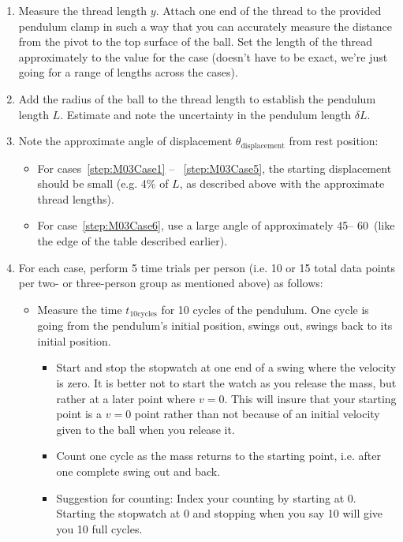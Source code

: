 \begin{enumerate}
\item Measure the thread length $y$. Attach one end of the thread to the provided pendulum clamp in such a way that you can accurately measure the distance from the pivot to the top surface of the ball. Set the length of the thread approximately to the value for the case (doesn't have to be exact, we're just going for a range of lengths across the cases).
\item Add the radius of the ball to the thread length to establish the pendulum length $L$. Estimate and note the uncertainty in the pendulum length $\delta L$.
\item Note the approximate angle of displacement $\theta_\text{displacement}$ from rest position:
    \begin{itemize}
        \item For cases~\ref{step:M03Case1} -- ~\ref{step:M03Case5}, the starting displacement should be small (e.g. 4\% of $L$, as described above with the approximate thread lengths).
        \item For case~\ref{step:M03Case6}, use a large angle of approximately 45\degree -- 60\degree~(like the edge of the table described earlier).
    \end{itemize}
\item For each case, perform 5 time trials per person (i.e. 10 or 15 total data points per two- or three-person group as mentioned above) as follows:
  \begin{itemize}
  \item Measure the time $t_{10\text{cycles}}$ for 10 cycles of the pendulum. One cycle is going from the pendulum's initial position, swings out, swings back to its initial position.
    \begin{itemize}
        \item Start and stop the stopwatch at one end of a swing where the velocity is zero. It is better not to start the watch as you release the mass, but rather at a later point where $v = 0$. This will insure that your starting point is a $v = 0$ point rather than not because of an initial velocity given to the ball when you release it. 
        \item Count one cycle as the mass returns to the starting point, i.e. after one complete swing out and back.
        \item Suggestion for counting: Index your counting by starting at 0. Starting the stopwatch at 0 and stopping when you say 10 will give you 10 full cycles.

\end{itemize}
\end{itemize}
\end{enumerate}
